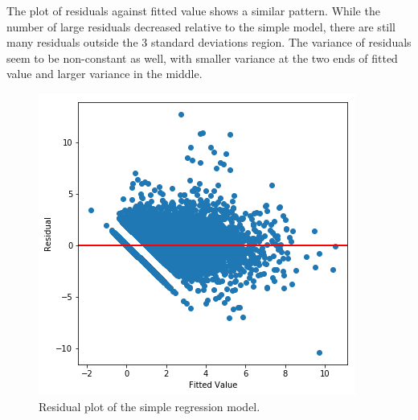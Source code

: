 \documentclass[]{article}
\begin{document}
The plot of residuals against fitted value shows a similar pattern. While the number of large residuals decreased relative to the simple model, there are still many residuals outside the 3 standard deviations region. The variance of residuals seem to be non-constant as well, with smaller variance at the two ends of fitted value and larger variance in the middle. 
%
\begin{figure}[hbtp]
	\centering
	\includegraphics[width=.6\columnwidth]{../Figures/residual_plot_complex}
	\caption{Residual plot of the simple regression model.}
	\label{fig:residual_plot_complex}
\end{figure}
%
\end{document}
